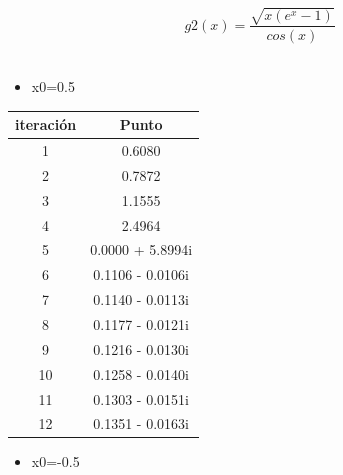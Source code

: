 \documentclass{udpreport}
\begin{document}
\begin{enumerate}
\begin{enumerate}
\begin{equation}
 g2(x) = \frac{\sqrt{x(e^x-1)}}
{cos(x)}
\end{equation}
\\
\begin{itemize}
\item x0=0.5
\end{itemize}

\begin{table}[H]
    \centering
        \begin{tabular} { |c|c|}
        
        \hline
        iteración  &  Punto\\
        \hline
        1 &  0.6080       \\
         \hline
        2 &   0.7872     \\
         \hline
        3 &  1.1555       \\
         \hline
        4 &   2.4964     \\
         \hline
        5 & 0.0000 + 5.8994i        \\
         \hline
        6 &  0.1106 - 0.0106i       \\
         \hline
        7 & 0.1140 - 0.0113i         \\
         \hline
        8 &    0.1177 - 0.0121i     \\
         \hline
        9 &     0.1216 - 0.0130i     \\
         \hline
        10 &   0.1258 - 0.0140i       \\
         \hline
        11 &    0.1303 - 0.0151i   \\
         \hline
        12 &  0.1351 - 0.0163i        \\
        \hline
        
        \end{tabular}
        
    \end{table}
    \begin{itemize}
\item x0=-0.5
\end{itemize}

\begin{table}[H]
    \centering
        \begin{tabular} { |c|c|}
        

\end{tabular}
\end{table}
\end{enumerate}
\end{enumerate}
\end{document}
